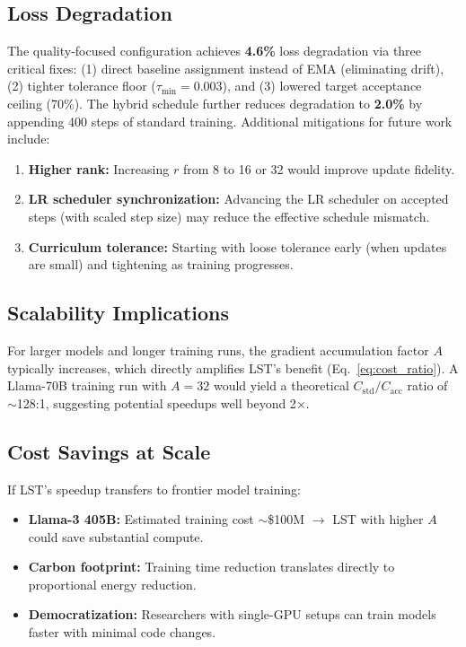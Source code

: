 \documentclass[conference]{IEEEtran}
\begin{document}
\subsection{Loss Degradation}

The quality-focused configuration achieves \textbf{4.6\%} loss degradation via three critical fixes: (1) direct baseline assignment instead of EMA (eliminating drift), (2) tighter tolerance floor ($\tau_{\min}{=}0.003$), and (3) lowered target acceptance ceiling (70\%). The hybrid schedule further reduces degradation to \textbf{2.0\%} by appending 400 steps of standard training. Additional mitigations for future work include:

\begin{enumerate}
    \item \textbf{Higher rank:} Increasing $r$ from 8 to 16 or 32 would improve update fidelity.
    \item \textbf{LR scheduler synchronization:} Advancing the LR scheduler on accepted steps (with scaled step size) may reduce the effective schedule mismatch.
    \item \textbf{Curriculum tolerance:} Starting with loose tolerance early (when updates are small) and tightening as training progresses.
\end{enumerate}

\subsection{Scalability Implications}

For larger models and longer training runs, the gradient accumulation factor $A$ typically increases, which directly amplifies LST's benefit (Eq.~\ref{eq:cost_ratio}). A Llama-70B training run with $A = 32$ would yield a theoretical $C_{\mathrm{std}} / C_{\mathrm{acc}}$ ratio of $\sim$128:1, suggesting potential speedups well beyond 2$\times$.

\subsection{Cost Savings at Scale}

If LST's speedup transfers to frontier model training:

\begin{itemize}
    \item \textbf{Llama-3 405B:} Estimated training cost $\sim$\$100M $\rightarrow$ LST with higher $A$ could save substantial compute.
    \item \textbf{Carbon footprint:} Training time reduction translates directly to proportional energy reduction.
    \item \textbf{Democratization:} Researchers with single-GPU setups can train models faster with minimal code changes.
\end{itemize}
\end{document}
